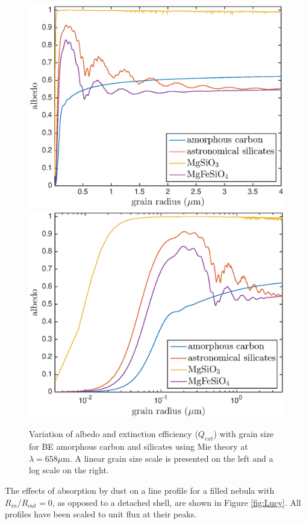 \documentclass[useAMS,usenatbib,usegraphicx]{mnras}
\begin{document}
\begin{figure}
\includegraphics[trim =0 0 0 0,clip=true,scale=0.43]{albedo_grainsize_upto4_2}
\includegraphics[trim =0 0 0 0,clip=true,scale=0.43]{albedo_grainsize_upto4_log_2}
\caption{Variation of albedo and extinction efficiency ($Q_{ext}$) with grain size for \citet{Zubko1996} BE amorphous carbon and \citet{Draine1984} silicates using Mie theory at $\lambda = 658 \mu $m. A linear grain size scale is presented on the left and a log scale on the right.}
\label{albedo_grain}

\end{figure}

The effects of absorption by dust on a line profile for a filled nebula with $R_{in}/R_{out}=0$, as opposed 
to a detached shell, are shown in Figure \ref{fig:Lucy}.  
All profiles have been scaled to unit flux at their peaks.
\end{document}
